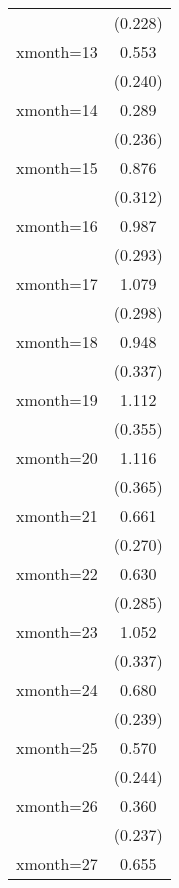 \begin{table}[htbp]
\begin{tabular}{l*{1}{c}}
                    &     (0.228)         \\
[1em]
xmonth=13           &       0.553\sym{*}  \\
                    &     (0.240)         \\
[1em]
xmonth=14           &       0.289         \\
                    &     (0.236)         \\
[1em]
xmonth=15           &       0.876\sym{**} \\
                    &     (0.312)         \\
[1em]
xmonth=16           &       0.987\sym{***}\\
                    &     (0.293)         \\
[1em]
xmonth=17           &       1.079\sym{***}\\
                    &     (0.298)         \\
[1em]
xmonth=18           &       0.948\sym{**} \\
                    &     (0.337)         \\
[1em]
xmonth=19           &       1.112\sym{**} \\
                    &     (0.355)         \\
[1em]
xmonth=20           &       1.116\sym{**} \\
                    &     (0.365)         \\
[1em]
xmonth=21           &       0.661\sym{*}  \\
                    &     (0.270)         \\
[1em]
xmonth=22           &       0.630\sym{*}  \\
                    &     (0.285)         \\
[1em]
xmonth=23           &       1.052\sym{**} \\
                    &     (0.337)         \\
[1em]
xmonth=24           &       0.680\sym{**} \\
                    &     (0.239)         \\
[1em]
xmonth=25           &       0.570\sym{*}  \\
                    &     (0.244)         \\
[1em]
xmonth=26           &       0.360         \\
                    &     (0.237)         \\
[1em]
xmonth=27           &       0.655\sym{*}  \\

\end{tabular}
\end{table}
